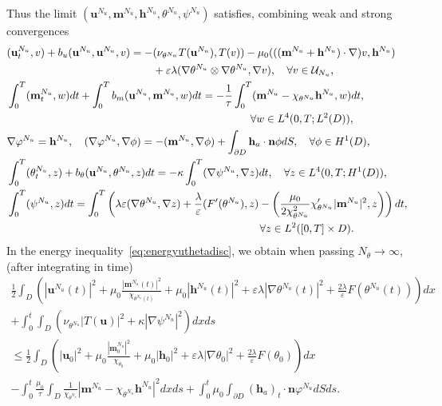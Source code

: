 \documentclass[10pt,letterpaper,twoside]{amsart}
\theoremstyle{definition}{\newtheorem{definition}[lemma]{Definition}}
\theoremstyle{note}{\newtheorem{claim}{Claim}[section]
\newtheorem*{claim*}{Claim}}
\numberwithin{equation}{section}
\newcommand{\dom}{D}
\newcommand{\eps}{\varepsilon}
\newcommand{\Grad}{\nabla}
\newcommand{\bu}{\mathbf{u}}
\newcommand{\bm}{\mathbf{m}}
\newcommand{\bmc}{\mathbf{m}^{N_u}}
\newcommand{\bhc}{\mathbf{h}^{N_u}}
\newcommand{\buc}{\mathbf{u}^{N_u}}
\newcommand{\thc}{\theta^{N_u}}
\newcommand{\phc}{\varphi^{N_u}}
\newcommand{\psic}{\psi^{N_u}}
\newcommand{\bh}{\mathbf{h}}
\begin{document}
 Thus the limit $(\bu^{N_u},\bm^{N_u},\bh^{N_u},\theta^{N_u},\psi^{N_u})$ satisfies, combining weak and strong convergences
 \begin{subequations}\label{eq:Galerkinsolve3}
 	\begin{align}
 		&(\buc_t,v)+b_u(\buc,\buc,v)=-(\nu_{\thc} T(\buc),T(v))-\mu_0(((\bmc+\bhc)\cdot\Grad)v,\bhc)\label{eq:NSdiscrete3}\\
 		&\hphantom{(\buc_t,v)+b_u(\buc,\buc,v)=-}+\eps\lambda(\Grad\thc\otimes\Grad\thc,\Grad v), \quad \forall v\in \mathcal{U}_{N_u},\notag \\
 		&\int_0^T(\bmc_t,w)dt+\int_0^T b_m(\buc,\bmc,w)dt =-\frac{1}{\tau}\int_0^T (\bmc-\chi_{\thc}\bhc,w)dt ,\label{eq:meqdiscrete3}\\
 		&\hphantom{\int_0^T(\bmc_t,w)dt+\int_0^T b_m(\buc,\bmc,w)dt =-\frac{1}{\tau}\int_0^T } \forall w\in L^4(0,T;L^2(\dom)) ,\notag \\
 		&\Grad\phc=\bhc,\quad (\Grad \phc,\Grad \phi) =-(\bmc,\Grad\phi)+\int_{\partial\dom}\bh_a\cdot\mathbf{n}\phi dS,\quad \forall \phi\in H^1(\dom),\label{eq:bcmaxwell3}\\
 &\int_0^T	(\thc_t,z )+b_\theta(\buc,\thc,z) dt =-\kappa\int_0^T(\Grad\psic,\Grad z)dt ,\quad \forall z\in L^4(0,T;H^1(\dom)),\label{eq:phasefielddiscrete3}\\
 	&\int_0^T(\psic,z)dt =\int_0^T\left( \lambda\eps(\Grad\thc,\Grad z) +\frac{\lambda}{\eps}(F'(\thc),z)-\left(\frac{\mu_0}{2\chi_{\thc}^2}\chi'_{\thc}|\bmc|^2,z\right)\right) dt , \label{eq:psi3}\\
 	&\hphantom{\int_0^T(\psic,z)dt =\int_0^T( \eps\lambda(\Grad\thc,\Grad z) +\frac{\lambda}{\eps}(F'(\thc),z)-} \forall z\in L^2([0,T]\times\dom).\notag
 \end{align}
 \end{subequations}
 In the energy inequality~\eqref{eq:energyuthetadisc}, we obtain when passing  $N_\theta\to \infty$, (after integrating in time)
 \begin{multline}\label{eq:energyuthetadisc3}
 	\frac12\int_{\dom}\left(|\bu^{N_u}(t)|^2 + \mu_0\frac{|\bm^{N_u}(t)|^2}{\chi_{\theta^{N_u}(t)}}+ \mu_0|\bh^{N_u}(t)|^2+\varepsilon\lambda|\Grad\theta^{N_u}(t)|^2 + \frac{2\lambda}{\varepsilon}F(\theta^{N_u}(t))\right) dx\\
 	 + \int_0^t\int_{\dom} \left(\nu_{\theta^{N_u}} |T(\bu)|^2 + \kappa |\Grad\psi^{N_u}|^2 \right)dx ds \\
 	\leq 	\frac12\int_{\dom}\left(|\bu_0|^2 + \mu_0\frac{|\bm^{N_u}_0|^2}{\chi_{\theta_0}}+ \mu_0|\bh_0|^2+\varepsilon\lambda|\Grad\theta_0|^2 + \frac{2\lambda}{\varepsilon}F(\theta_0)\right) dx\\
 	- \int_0^t\frac{\mu_0}{\tau}\int_{\dom}\frac{1}{\chi_{\theta^{N_u}}}\left|\bm^{N_u}-\chi_{\theta^{N_u}}\bh^{N_u}\right|^2 dx ds
 	+ \int_0^t \mu_0\int_{\partial\dom}(\bh_a)_t\cdot\mathbf{n}\varphi^{N_u} dS ds.
 \end{multline}
\end{document}
